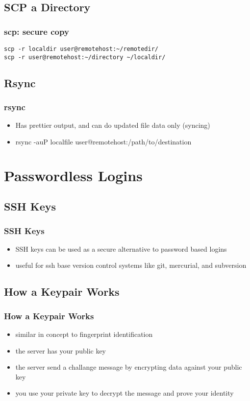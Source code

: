 \documentclass[hyperref={pdfpagelabels=false}]{beamer}
\begin{document}
\subsection{SCP a Directory}
\begin{frame}[fragile]
    \frametitle{scp: secure copy}
\begin{verbatim}
scp -r localdir user@remotehost:~/remotedir/
scp -r user@remotehost:~/directory ~/localdir/
\end{verbatim}
\end{frame}
\subsection{Rsync}
\frame
{
    \frametitle{rsync}
    \begin{itemize}
    \item{Has prettier output, and can do updated file data only (syncing)}
    \item{rsync -auP localfile user@remotehost:/path/to/destination}
    \end{itemize}
}
\section{Passwordless Logins}
\subsection{SSH Keys}
\frame
{
    \frametitle{SSH Keys}
    \begin{itemize}
    \item{SSH keys can be used as a secure alternative to password based logins}
    \item{useful for ssh base version control systems like git, mercurial, and subversion}
    \end{itemize}
}
\subsection{How a Keypair Works}
\frame
{
    \frametitle{How a Keypair Works}
    \begin{itemize}
    \item{similar in concept to fingerprint identification}
    \item{the server has your public key}
    \item{the server send a challange message by encrypting data against your public key}
    \item{you use your private key to decrypt the message and prove your identity}
    \end{itemize}
}
\end{document}
